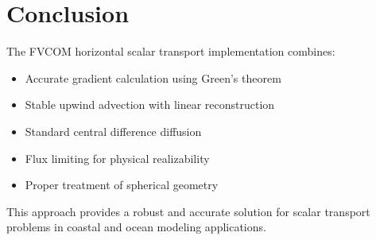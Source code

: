 \documentclass[11pt,a4paper]{article}
\begin{document}
\section{Conclusion}

The FVCOM horizontal scalar transport implementation combines:
\begin{itemize}
\item Accurate gradient calculation using Green's theorem
\item Stable upwind advection with linear reconstruction
\item Standard central difference diffusion
\item Flux limiting for physical realizability
\item Proper treatment of spherical geometry
\end{itemize}

This approach provides a robust and accurate solution for scalar transport problems in coastal and ocean modeling applications.
\end{document}
